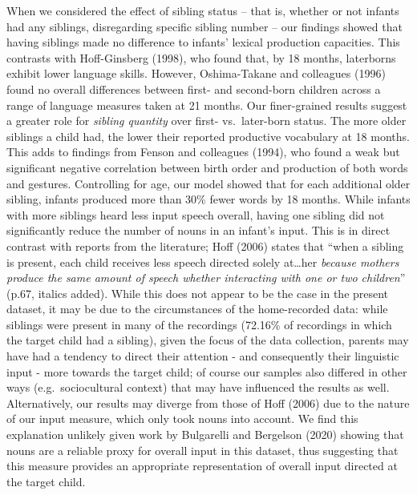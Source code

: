 \documentclass[
  english,
  man,floatsintext]{apa6}
\begin{document}
When we considered the effect of sibling status -- that is, whether or not infants had any siblings, disregarding specific sibling number -- our findings showed that having siblings made no difference to infants' lexical production capacities. This contrasts with Hoff-Ginsberg (1998), who found that, by 18 months, laterborns exhibit lower language skills. However, Oshima-Takane and colleagues (1996) found no overall differences between first- and second-born children across a range of language measures taken at 21 months. Our finer-grained results suggest a greater role for \emph{sibling quantity} over first- vs.~later-born status. The more older siblings a child had, the lower their reported productive vocabulary at 18 months. This adds to findings from Fenson and colleagues (1994), who found a weak but significant negative correlation between birth order and production of both words and gestures. Controlling for age, our model showed that for each additional older sibling, infants produced more than 30\% fewer words by 18 months.
While infants with more siblings heard less input speech overall, having one sibling did not significantly reduce the number of nouns in an infant's input. This is in direct contrast with reports from the literature; Hoff (2006) states that ``when a sibling is present, each child receives less speech directed solely at\ldots her \emph{because mothers produce the same amount of speech whether interacting with one or two children}'' (p.67, italics added). While this does not appear to be the case in the present dataset, it may be due to the circumstances of the home-recorded data: while siblings were present in many of the recordings (72.16\% of recordings in which the target child had a sibling), given the focus of the data collection, parents may have had a tendency to direct their attention - and consequently their linguistic input - more towards the target child; of course our samples also differed in other ways (e.g.~sociocultural context) that may have influenced the results as well. Alternatively, our results may diverge from those of Hoff (2006) due to the nature of our input measure, which only took nouns into account. We find this explanation unlikely given work by Bulgarelli and Bergelson (2020) showing that nouns are a reliable proxy for overall input in this dataset, thus suggesting that this measure provides an appropriate representation of overall input directed at the target child.
\end{document}

